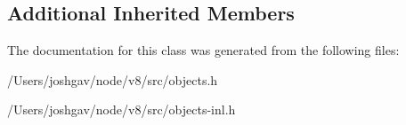 \subsection*{Additional Inherited Members}


The documentation for this class was generated from the following files\+:\begin{DoxyCompactItemize}
\item 
/\+Users/joshgav/node/v8/src/objects.\+h\item 
/\+Users/joshgav/node/v8/src/objects-\/inl.\+h\end{DoxyCompactItemize}
